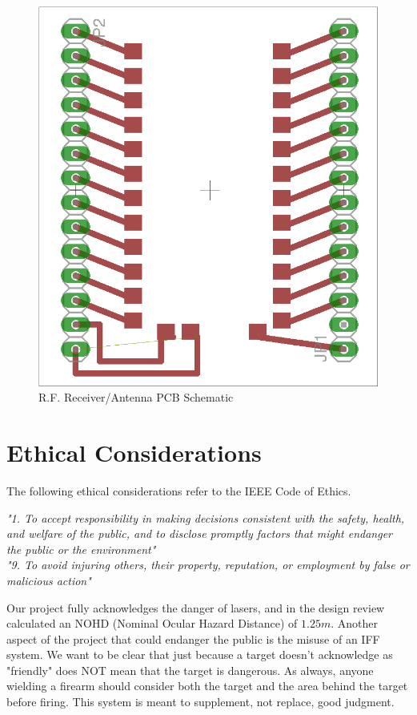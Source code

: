 \documentclass[letterpaper,10pt]{article}
\begin{document}
\begin{spacing}{1.15}
\begin{figure} [H]
	\centering
	\includegraphics[scale=1.8]{kh3-transmitter-breakout.png}
	\caption{R.F. Receiver/Antenna PCB Schematic\label{fig:receiver-breakout}}
\end{figure}

\section{Ethical Considerations} 
The following ethical considerations refer to the IEEE Code of Ethics\cite{IEEE}.

\textit{"1. To accept responsibility in making decisions consistent with the safety, health, and welfare of the public, and to disclose promptly factors that might endanger the public or the environment"} \\
\textit{"9. To avoid injuring others, their property, reputation, or employment by false or malicious action"}

Our project fully acknowledges the danger of lasers, and in the design review calculated an NOHD (Nominal Ocular Hazard Distance) of $1.25m$. Another aspect of the project that could endanger the public is the misuse of an IFF system. We want to be clear that just because a target doesn't acknowledge as "friendly" does NOT mean that the target is dangerous. As always, anyone wielding a firearm should consider both the target and the area behind the target before firing. This system is meant to supplement, not replace, good judgment.  


\end{spacing}
\end{document}
